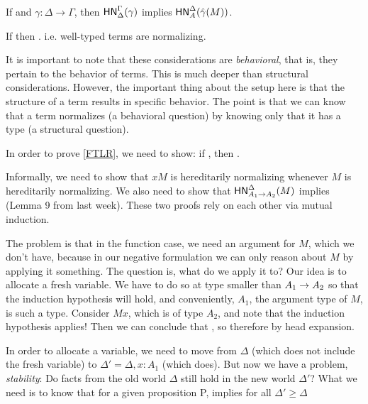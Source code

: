 \documentclass{article}
\begin{document}
\begin{theorem}
\label{FTLR}
If  and $\gamma: \Delta \to \Gamma$, then $\mathsf{HN}^{\Gamma}_{\Delta}(\gamma)$ implies $\mathsf{HN}^{\Delta}_{A}(\hat{\gamma}(M))$.
 \end{theorem}

 \begin{corollary}
  If  then . i.e. well-typed terms are normalizing.
 \end{corollary}

 It is important to note that these considerations are \textit{behavioral}, that is, they pertain to the behavior of terms. This is much deeper than structural considerations. However, the important thing about the setup here is that the structure of a term results in specific behavior. The point is that we can know that a term normalizes (a behavioral question) by knowing only that it has a type (a structural question).

In order to prove \cref{FTLR}, we need to show: if , then .

Informally, we need to show that $xM$ is hereditarily normalizing whenever $M$ is hereditarily normalizing. We also need to show that $\mathsf{HN}^{\Delta}_{A_1 \to A_2}(M)$ implies  (Lemma 9 from last week). These two proofs rely on each other via mutual induction.

The problem is that in the function case, we need an argument for $M$, which we don't have, because in our negative formulation we can only reason about $M$ by applying it something. The question is, what do we apply it to? Our idea is to allocate a fresh variable. We have to do so at type smaller than $A_1 \to A_2$ so that the induction hypothesis will hold, and conveniently, $A_1$, the argument type of $M$, is such a type. Consider $Mx$, which is of type $A_2$, and note that the induction hypothesis applies! Then we can conclude that , so therefore  by head expansion.

In order to allocate a variable, we need to move from $\Delta$ (which does not include the fresh variable) to $\Delta' = \Delta, x: A_1$ (which does). But now we have a problem, \textit{stability}: Do facts from the old world $\Delta$ still hold in the new world $\Delta'$? What we need is to know that for a given proposition P,  implies  for all $\Delta' \geq \Delta$
\end{document}
